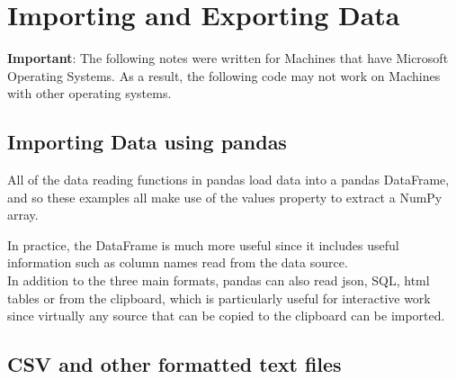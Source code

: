 \documentclass[KSmain.tex]{subfiles}
\begin{document}
 



\section{Importing and Exporting Data}

\begin{framed}
\noindent \textbf{Important}: The following notes were written for Machines that have Microsoft Operating Systems. As a result, the following code may not work on Machines with other operating systems.
\end{framed}
\subsection{Importing Data using pandas}


All of the data reading functions in pandas load data into a pandas
DataFrame, and so these examples all make use of the values property to extract a
NumPy array. 

\noindent In practice, the DataFrame is much more useful since it includes useful information such
as column names read from the data source. \\
In addition to the three main formats, pandas can
also read json, SQL, html tables or from the clipboard, which is particularly useful for interactive work
since virtually any source that can be copied to the clipboard can be imported.

\subsection{CSV and other formatted text files}
\end{document}
